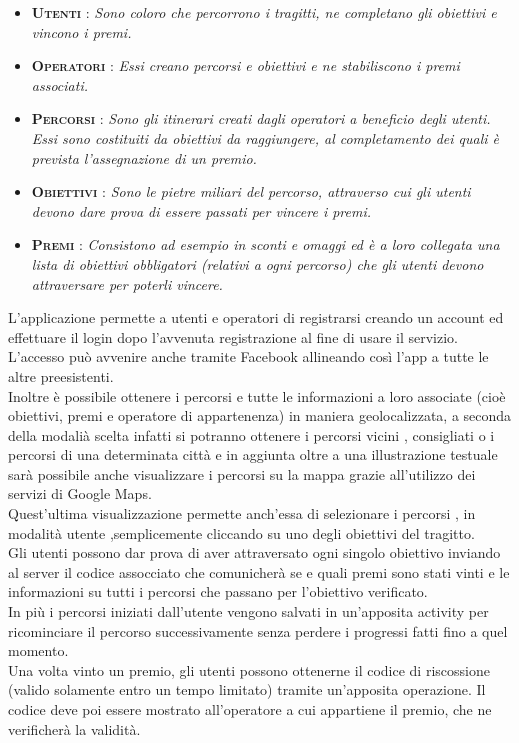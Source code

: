 \begin{itemize}  

\item \textsc{\bfseries Utenti} : \emph{Sono coloro che percorrono i tragitti, ne completano gli obiettivi e vincono i premi.}

\item \textsc{\bfseries Operatori} : \emph{Essi creano percorsi e obiettivi e ne stabiliscono i premi associati.}

\item \textsc{\bfseries Percorsi} : \emph{Sono gli itinerari creati dagli operatori a beneficio degli utenti. Essi sono costituiti da obiettivi da raggiungere, al completamento dei quali è prevista l’assegnazione di un premio.}

\item \textsc{\bfseries Obiettivi} : \emph{Sono le pietre miliari del percorso, attraverso cui gli utenti devono dare prova di essere passati per vincere i premi.}

\item \textsc{\bfseries Premi} : \emph{Consistono ad esempio in sconti e omaggi ed è a loro collegata una lista di obiettivi obbligatori (relativi a ogni percorso) che gli utenti devono attraversare per poterli vincere.}\\[0.2cm]

\end{itemize}
L'applicazione permette a utenti e operatori di registrarsi creando un account ed effettuare il login dopo l'avvenuta registrazione al fine di usare il servizio.\\
L'accesso può avvenire anche tramite Facebook allineando così l'app a tutte le altre preesistenti.\\
Inoltre è possibile ottenere i percorsi e tutte le informazioni a loro associate (cioè obiettivi, premi e operatore di appartenenza) in maniera geolocalizzata,
a seconda della modalià scelta infatti si potranno ottenere i percorsi vicini , consigliati o i percorsi di una determinata città e in aggiunta oltre a una illustrazione testuale sarà possibile anche visualizzare i percorsi su la mappa grazie all'utilizzo dei servizi di Google Maps.\\
Quest'ultima visualizzazione permette anch'essa di selezionare i percorsi , in modalità utente ,semplicemente cliccando su uno degli obiettivi del tragitto.\\[0.2cm]

Gli utenti possono dar prova di aver attraversato ogni singolo obiettivo inviando al server il codice assocciato che comunicherà se e quali premi sono stati vinti e le informazioni su tutti i percorsi che passano per l’obiettivo verificato.\\
In più i percorsi iniziati dall'utente vengono salvati in un'apposita activity per ricominciare il percorso successivamente senza perdere i progressi fatti fino a quel momento.\\ 
Una volta vinto un premio, gli utenti possono ottenerne il codice di riscossione (valido solamente entro un tempo limitato) tramite un’apposita operazione. Il codice deve poi
essere mostrato all’operatore a cui appartiene il premio, che ne verificherà la validità.\\[0.2cm]

